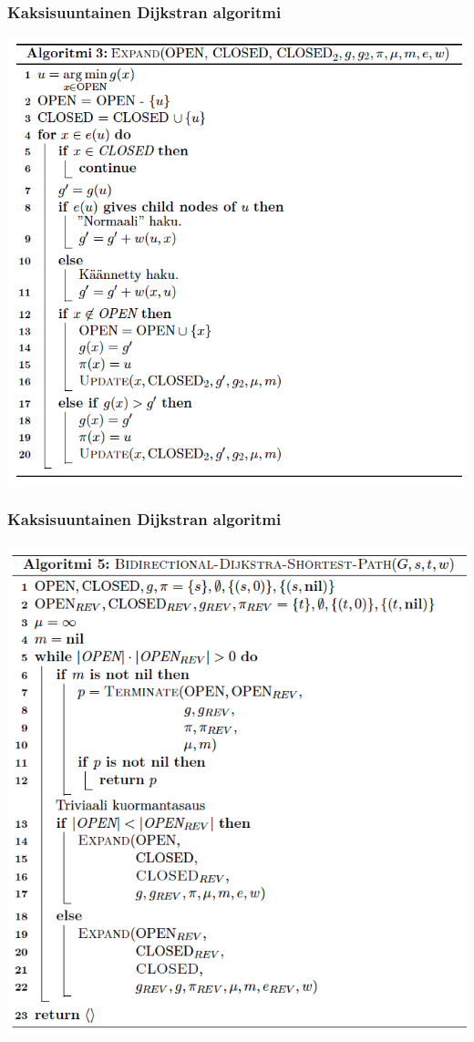 \documentclass{beamer}
\begin{document}
\begin{frame}
  \frametitle{Kaksisuuntainen Dijkstran algoritmi}
  \includegraphics[width=\textwidth,height=0.8\textheight,keepaspectratio]{expand}
\end{frame}

\begin{frame}
  \frametitle{Kaksisuuntainen Dijkstran algoritmi}
  \includegraphics[width=\textwidth,height=0.85\textheight,keepaspectratio]{bidijkstra}
\end{frame}
\end{document}
